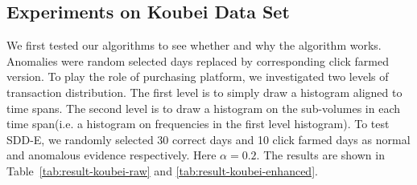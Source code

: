 \documentclass{article}
\begin{document}
		\subsection{Experiments on Koubei Data Set}\label{sec:exp-raw}
			We first tested our algorithms to see whether and why the algorithm works. Anomalies were random selected days replaced by corresponding click farmed version. To play the role of purchasing platform, we investigated two levels of transaction distribution. The first level is to simply draw a histogram aligned to time spans. The second level is to draw a histogram on the sub-volumes in each time span(i.e. a histogram on frequencies in the first level histogram).
			To test SDD-E, we randomly selected 30 correct days and 10 click farmed days as normal and anomalous evidence respectively.
			Here $\alpha = 0.2$. The results are shown in Table~\ref{tab:result-koubei-raw} and \ref{tab:result-koubei-enhanced}.
	
\end{document}
